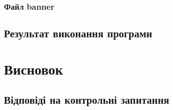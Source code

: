 \documentclass[a4paper, 12pt, oneside]{extarticle}
\begin{document}
\subsubsection*{Файл banner}


\subsection*{Результат виконання програми}



\section*{Висновок}

\subsection*{Відповіді на контрольні запитання}
\end{document}
